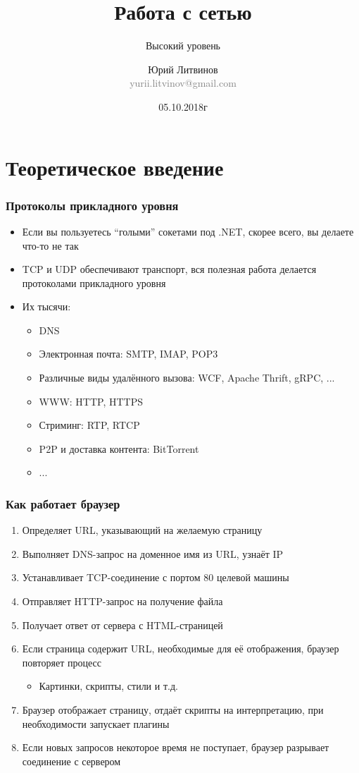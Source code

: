 \documentclass[xetex,mathserif,serif]{beamer}
\title{Работа с сетью}
\subtitle{Высокий уровень}
\author[Юрий Литвинов]{Юрий Литвинов\\\small{\textcolor{gray}{yurii.litvinov@gmail.com}}}
\date{05.10.2018г}
\begin{document}
	\frame{\titlepage}

	\section{Теоретическое введение}

	\begin{frame}
		\frametitle{Протоколы прикладного уровня}
		\begin{itemize}
			\item Если вы пользуетесь ``голыми'' сокетами под .NET, скорее всего, вы делаете что-то не так
			\item TCP и UDP обеспечивают транспорт, вся полезная работа делается протоколами прикладного уровня
			\item Их тысячи:
			\begin{itemize}
				\item DNS
				\item Электронная почта: SMTP, IMAP, POP3
				\item Различные виды удалённого вызова: WCF, Apache Thrift, gRPC, ...
				\item WWW: HTTP, HTTPS
				\item Стриминг: RTP, RTCP
				\item P2P и доставка контента: BitTorrent
				\item ...
			\end{itemize}
		\end{itemize}
	\end{frame}

	\begin{frame}
		\frametitle{Как работает браузер}
		\begin{enumerate}
			\item Определяет URL, указывающий на желаемую страницу
			\item Выполняет DNS-запрос на доменное имя из URL, узнаёт IP
			\item Устанавливает TCP-соединение с портом 80 целевой машины
			\item Отправляет HTTP-запрос на получение файла
			\item Получает ответ от сервера с HTML-страницей
			\item Если страница содержит URL, необходимые для её отображения, браузер повторяет процесс
			\begin{itemize}
				\item Картинки, скрипты, стили и т.д.
			\end{itemize}
			\item Браузер отображает страницу, отдаёт скрипты на интерпретацию, при необходимости запускает плагины
			\item Если новых запросов некоторое время не поступает, браузер разрывает соединение с сервером
		\end{enumerate}
	\end{frame}
\end{document}
